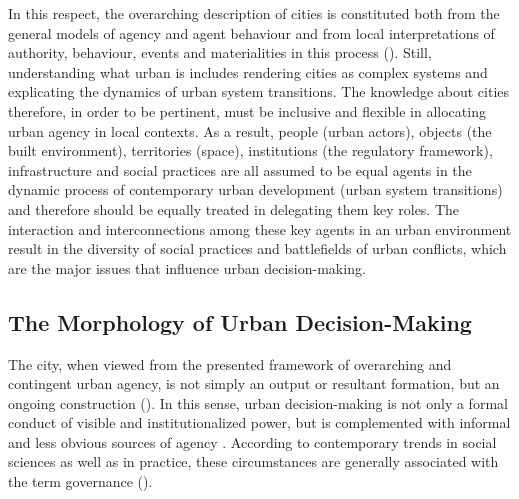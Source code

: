 \documentclass[11pt]{report}
\begin{document}
{{{In this respect, the overarching description of cities is constituted both from the general models of agency and agent behaviour and from local interpretations of authority, behaviour, events and materialities in this process (\href{Healey}{\citealt{healey_institutional_1992}}).
Still, understanding what urban is includes rendering cities as complex systems and explicating the dynamics of urban  system transitions.
The knowledge about cities therefore, in order to be pertinent, must be inclusive and flexible in allocating urban agency in local contexts. 
As a result, people (urban actors), objects (the built environment), territories (space), institutions (the regulatory framework), infrastructure and social practices are all assumed to be equal agents in the dynamic process of contemporary urban development (urban system transitions) and therefore should be equally treated in delegating them key roles.
The interaction and interconnections among these key agents in an urban environment result in the diversity of social practices and battlefields of urban conflicts, which are the major issues that influence urban decision-making. 

\subsection{The Morphology of Urban Decision-Making}

The city, when viewed from the presented framework of overarching and contingent urban agency, is not simply an output or resultant formation,  but  an ongoing  construction (\href{McFarlane}{\citealt{mcfarlane_assemblage_2011}}).
In this sense, urban decision-making is not only a formal conduct of visible and institutionalized power, but is  complemented with informal and less obvious sources of agency \cite{(Lukes 1974 from Healey 1997)}.
According to contemporary trends in social sciences as well as in practice, these circumstances are generally associated with the term governance (\href{Pierre}{\citealt{pierre_governance_2000}}).
\\

}}}
\end{document}
